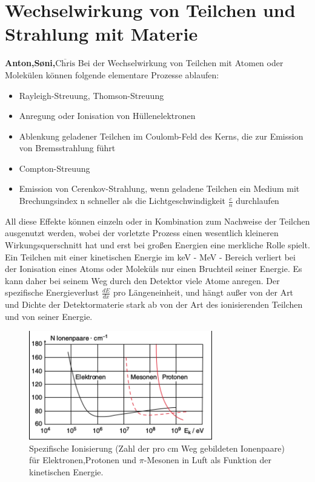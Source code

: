 \documentclass[Ex4_Zusammenfassung.tex]{subfiles}
\begin{document}
\chapter{Wechselwirkung von Teilchen und Strahlung mit Materie}
\textbf{Anton,S\o{}ni,$\overline{\text{Chris}}$}
Bei der Wechselwirkung von Teilchen mit Atomen oder Molekülen können folgende elementare Prozesse ablaufen:
\begin{itemize}
\item Rayleigh-Streuung, Thomson-Streuung
\item Anregung oder Ionisation von Hüllenelektronen
\item Ablenkung geladener Teilchen im Coulomb-Feld des Kerns, die zur Emission von Bremsstrahlung führt
\item Compton-Streuung
\item Emission von Cerenkov-Strahlung, wenn geladene Teilchen ein Medium mit Brechungsindex n schneller als die Lichtgeschwindigkeit $\frac{c}{n}$ durchlaufen
\end{itemize}
All diese Effekte können einzeln oder in Kombination zum Nachweise der Teilchen ausgenutzt werden, wobei der vorletzte Prozess einen wesentlich kleineren Wirkungsquerschnitt hat und erst bei großen Energien eine merkliche Rolle spielt.
Ein Teilchen mit einer kinetischen Energie im keV - MeV - Bereich verliert bei der Ionisation eines Atoms oder Moleküls nur einen Bruchteil seiner Energie. Es kann daher bei seinem Weg durch den Detektor viele Atome anregen. Der spezifische Energieverlust $\frac{dE}{dx}$ pro Längeneinheit, und hängt außer von der Art und Dichte der Detektormaterie stark ab von der Art des ionisierenden Teilchen und von seiner Energie.
\begin{figure}[h]
\includegraphics[width=8cm]{Ionisationsplot.png}
\caption{Spezifische Ionisierung (Zahl der pro cm Weg gebildeten Ionenpaare) für Elektronen,Protonen und $\pi$-Mesonen in Luft als Funktion der kinetischen Energie.}
\end{figure}
\newpage
\end{document}
